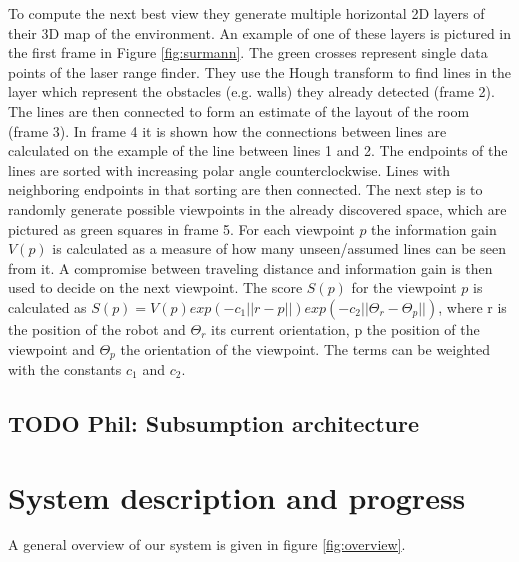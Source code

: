 \documentclass[a4paper,11pt,english]{article}
\begin{document}
To compute the next best view they generate multiple horizontal 2D layers of their 3D map of the environment.
An example of one of these layers is pictured in the first frame in Figure \ref{fig:surmann}.
The green crosses represent single data points of the laser range finder.
They use the Hough transform to find lines in the layer which represent the obstacles (e.g. walls) they already detected (frame 2).
The lines are then connected to form an estimate of the layout of the room (frame 3).
In frame 4 it is shown how the connections between lines are calculated on the example of the line between lines 1 and 2. 
The endpoints of the lines are sorted with increasing polar angle counterclockwise.
Lines with neighboring endpoints in that sorting are then connected.
The next step is to randomly generate possible viewpoints in the already discovered space, which are pictured as green squares in frame 5.
For each viewpoint $p$ the information gain $V(p)$ is calculated as a measure of how many unseen/assumed lines can be seen from it.
A compromise between traveling distance and information gain is then used to decide on the next viewpoint.
The score $S(p)$ for the viewpoint $p$ is calculated as $S(p) = V(p) exp(-c_1||r-p||)exp(-c_2||\Theta_r-\Theta_p||)$, where r is the position of the robot and $\Theta_r$ its current orientation, p the position of the viewpoint and $\Theta_p$ the orientation of the viewpoint. The terms can be weighted with the constants $c_1$ and $c_2$.

\subsection{TODO Phil: Subsumption architecture}
\label{background:subsumption}

\section{System description and progress}
\label{system}
A general overview of our system is given in figure \ref{fig:overview}.
\end{document}
